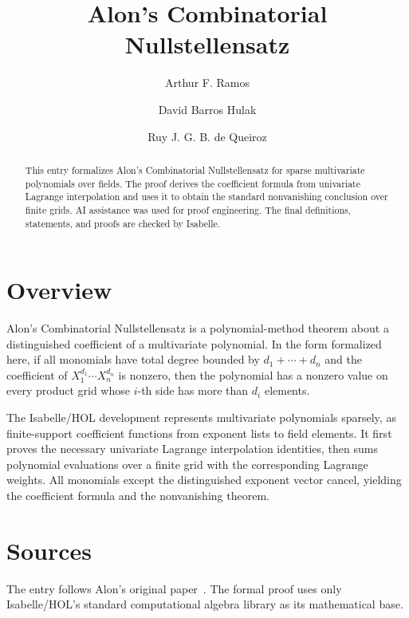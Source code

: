 \documentclass[11pt,a4paper]{article}
\begin{document}
\title{Alon's Combinatorial Nullstellensatz}
\author{Arthur F. Ramos \and David Barros Hulak \and Ruy J. G. B. de Queiroz}
\maketitle

\begin{abstract}
This entry formalizes Alon's Combinatorial Nullstellensatz for sparse
multivariate polynomials over fields. The proof derives the coefficient formula
from univariate Lagrange interpolation and uses it to obtain the standard
nonvanishing conclusion over finite grids. AI assistance was used for proof
engineering. The final definitions, statements, and proofs are checked by
Isabelle.
\end{abstract}

\section{Overview}

Alon's Combinatorial Nullstellensatz is a polynomial-method theorem about a
distinguished coefficient of a multivariate polynomial. In the form formalized
here, if all monomials have total degree bounded by $d_1+\cdots+d_n$ and the
coefficient of $X_1^{d_1}\cdots X_n^{d_n}$ is nonzero, then the polynomial has a
nonzero value on every product grid whose $i$-th side has more than $d_i$
elements.

The Isabelle/HOL development represents multivariate polynomials sparsely, as
finite-support coefficient functions from exponent lists to field elements. It
first proves the necessary univariate Lagrange interpolation identities, then
sums polynomial evaluations over a finite grid with the corresponding Lagrange
weights. All monomials except the distinguished exponent vector cancel, yielding
the coefficient formula and the nonvanishing theorem.

\section{Sources}

The entry follows Alon's original paper~\cite{Alon1999}. The formal proof uses
only Isabelle/HOL's standard computational algebra library as its mathematical
base.

\tableofcontents

\sloppy

\fussy



\end{document}
